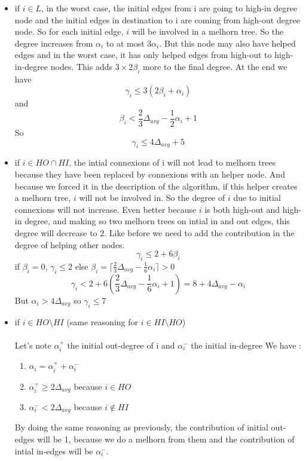 \documentclass{article}
\begin{document}
\begin{itemize}
  \item if $i \in L$, in the worst case, the initial edges from i are
  going to high-in degree node and the initial edges in destination to i
  are coming from high-out degree node. So for each initial edge, $i$ will
  be involved in a melhorn tree. So the degree increases from $\alpha_i$
  to at most $3\alpha_i$. But this node may also have helped edges and
  in the worst case, it has only helped edges from high-out to
  high-in-degree nodes.
  This adds $3 \times 2\beta_i$ more to the final degree. At the end we have
  $$\gamma_i \leq 3(2\beta_i +\alpha_i)$$
  and
  $$\beta_i < \frac{2}{3}\Delta_{avg} - \frac{1}{2}\alpha_i + 1$$
  So
  $$\gamma_i \leq 4\Delta_{avg} + 5$$
  \item if $i \in HO \cap HI$, the intial connexions of i will not lead
  to melhorn trees because they have been replaced by connexions
  with an helper node. And because we forced it in the description
  of the algorithm, if this helper creates a melhorn tree, $i$ will
  not be involved in. So the degree of $i$ due to initial connexions
  will not increase. Even better because $i$ is both high-out and
  high-in degree, and making so two melhorn trees on intial in and out
  edges, this degree will decrease to 2. Like before we need to add
  the contribution in the degree of helping other nodes.
  $$\gamma_i \leq 2 + 6\beta_i$$
  if $\beta_i = 0$, $\gamma_i \leq 2$
  else $\beta_i = \lceil\frac{2}{3}\Delta_{avg}-\frac{1}{6}\alpha_i\rceil > 0$
  $$\gamma_i < 2 + 6(\frac{2}{3}\Delta_{avg} - \frac{1}{6}\alpha_i + 1) = 8 + 4\Delta_{avg} - \alpha_i$$
  But $\alpha_i > 4\Delta_{avg}$ so $\gamma_i \leq 7$
  \item if $i \in HO \setminus HI$ (same reasoning for $i \in HI \setminus HO$)\\\\
  Let's note $\alpha_i^+$ the initial out-degree of i and $\alpha_i^-$ the initial in-degree
  We have :
  \begin{enumerate}
    \item $\alpha_i = \alpha_i^+ + \alpha_i^-$
    \item $\alpha_i^+ \geq 2\Delta_{avg}$ because $i \in HO$
    \item $\alpha_i^- < 2\Delta_{avg}$ because $i \notin HI$
  \end{enumerate}
  By doing the same reasoning as previously, the contribution of
  initial out-edges will be 1, because we do a melhorn from them
  and the contribution of intial in-edges will be $\alpha_i^-$.

\end{itemize}
\end{document}
